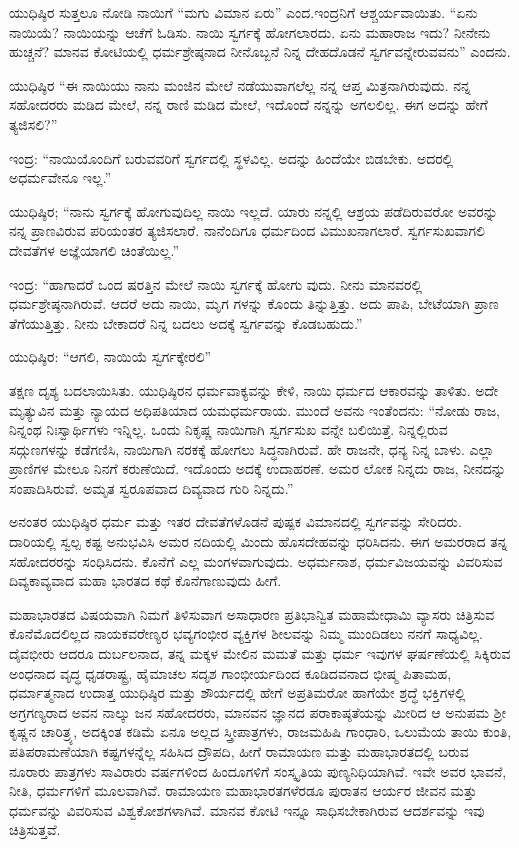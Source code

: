 ಯುಧಿಷ್ಠಿರ ಸುತ್ತಲೂ ನೋಡಿ ನಾಯಿಗೆ “ಮಗು ವಿಮಾನ ಏರು” ಎಂದ.ಇಂದ್ರನಿಗೆ ಆಶ್ಚರ್ಯವಾಯಿತು. “ಏನು ನಾಯಿಯೆ? ನಾಯಿಯನ್ನು ಆಚೆಗೆ ಓಡಿಸು. ನಾಯಿ ಸ್ವರ್ಗಕ್ಕೆ ಹೋಗಲಾರದು. ಏನು ಮಹಾರಾಜ ಇದು? ನೀನೇನು ಹುಚ್ಚನೆ? ಮಾನವ ಕೋಟಿಯಲ್ಲಿ ಧರ್ಮಶ್ರೇಷ್ಠನಾದ ನೀನೊಬ್ಬನೆ ನಿನ್ನ ದೇಹದೊಡನೆ ಸ್ವರ್ಗವನ್ನೇರುವವನು” ಎಂದನು.

ಯುಧಿಷ್ಠಿರ “ಈ ನಾಯಿಯು ನಾನು ಮಂಜಿನ ಮೇಲೆ ನಡೆಯುವಾಗಲೆಲ್ಲ ನನ್ನ ಆಪ್ತ ಮಿತ್ರನಾಗಿರುವುದು. ನನ್ನ ಸಹೋದರರು ಮಡಿದ ಮೇಲೆ, ನನ್ನ ರಾಣಿ ಮಡಿದ ಮೇಲೆ, ಇದೊಂದೆ ನನ್ನನ್ನು ಅಗಲಲಿಲ್ಲ. ಈಗ ಅದನ್ನು ಹೇಗೆ ತ್ಯಜಿಸಲಿ?”

ಇಂದ್ರ: “ನಾಯಿಯೊಂದಿಗೆ ಬರುವವರಿಗೆ ಸ್ವರ್ಗದಲ್ಲಿ ಸ್ಥಳವಿಲ್ಲ. ಅದನ್ನು ಹಿಂದೆಯೇ ಬಿಡಬೇಕು. ಅದರಲ್ಲಿ ಅಧರ್ಮವೇನೂ ಇಲ್ಲ.”

ಯುಧಿಷ್ಠಿರ; “ನಾನು ಸ್ವರ್ಗಕ್ಕೆ ಹೋಗುವುದಿಲ್ಲ ನಾಯಿ ಇಲ್ಲದೆ. ಯಾರು ನನ್ನಲ್ಲಿ ಆಶ್ರಯ ಪಡೆದಿರುವರೋ ಅವರನ್ನು ನನ್ನ ಪ್ರಾಣವಿರುವ ಪರಿಯಂತರ ತ್ಯಜಿಸಲಾರೆ. ನಾನೆಂದಿಗೂ ಧರ್ಮದಿಂದ ವಿಮುಖನಾಗಲಾರೆ. ಸ್ವರ್ಗಸುಖವಾಗಲಿ ದೇವತೆಗಳ ಅಜ್ಞೆಯಾಗಲಿ ಚಿಂತೆಯಿಲ್ಲ.”

ಇಂದ್ರ: “ಹಾಗಾದರೆ ಒಂದ ಷರತ್ತಿನ ಮೇಲೆ ನಾಯಿ ಸ್ವರ್ಗಕ್ಕೆ ಹೋಗು ವುದು. ನೀನು ಮಾನವರಲ್ಲಿ ಧರ್ಮಶ್ರೇಷ್ಠನಾಗಿರುವೆ. ಆದರೆ ಅದು ನಾಯಿ, ಮೃಗ ಗಳನ್ನು ಕೊಂದು ತಿನ್ನುತ್ತಿತ್ತು. ಅದು ಪಾಪಿ, ಬೇಟೆಯಾಗಿ ಪ್ರಾಣ ತೆಗೆಯುತ್ತಿತ್ತು. ನೀನು ಬೇಕಾದರೆ ನಿನ್ನ ಬದಲು ಅದಕ್ಕೆ ಸ್ವರ್ಗವನ್ನು ಕೊಡಬಹುದು.”

ಯುಧಿಷ್ಠಿರ: “ಆಗಲಿ, ನಾಯಿಯೆ ಸ್ವರ್ಗಕ್ಕೇರಲಿ”

ತಕ್ಷಣ ದೃಶ್ಯ ಬದಲಾಯಿಸಿತು. ಯುಧಿಷ್ಠಿರನ ಧರ್ಮವಾಕ್ಯವನ್ನು ಕೇಳಿ, ನಾಯಿ ಧರ್ಮದ ಆಕಾರವನ್ನು ತಾಳಿತು. ಅದೇ ಮೃತ್ಯುವಿನ ಮತ್ತು ನ್ಯಾಯದ ಅಧಿಪತಿಯಾದ ಯಮಧರ್ಮರಾಯ. ಮುಂದೆ ಅವನು ಇಂತೆಂದನು: “ನೋಡು ರಾಜ, ನಿನ್ನಂಥ ನಿಃಸ್ವಾರ್ಥಿಗಳು ಇನ್ನಿಲ್ಲ. ಒಂದು ನಿಕೃಷ್ಣ ನಾಯಿಗಾಗಿ ಸ್ವರ್ಗಸುಖ ವನ್ನೇ ಬಲಿಯಿತ್ತೆ. ನಿನ್ನಲ್ಲಿರುವ ಸದ್ಗುಣಗಳನ್ನು ಕಡೆಗಣಿಸಿ, ನಾಯಿಗಾಗಿ ನರಕಕ್ಕೆ ಹೋಗಲು ಸಿದ್ಧನಾಗಿರುವೆ. ಹೇ ರಾಜನೇ, ಧನ್ಯ ನಿನ್ನ ಬಾಳು. ಎಲ್ಲಾ ಪ್ರಾಣಿಗಳ ಮೇಲೂ ನಿನಗೆ ಕರುಣೆಯಿದೆ. ಇದೊಂದು ಅದಕ್ಕೆ ಉದಾಹರಣೆ. ಅಮರ ಲೋಕ ನಿನ್ನದು ರಾಜ, ನೀನದನ್ನು ಸಂಪಾದಿಸಿರುವೆ. ಅಮೃತ ಸ್ವರೂಪವಾದ ದಿವ್ಯವಾದ ಗುರಿ ನಿನ್ನದು.”

ಅನಂತರ ಯುಧಿಷ್ಠಿರ ಧರ್ಮ ಮತ್ತು ಇತರ ದೇವತೆಗಳೊಡನೆ ಪುಷ್ಪಕ ವಿಮಾನದಲ್ಲಿ ಸ್ವರ್ಗವನ್ನು ಸೇರಿದರು. ದಾರಿಯಲ್ಲಿ ಸ್ವಲ್ಪ ಕಷ್ಟ ಅನುಭವಿಸಿ ಅಮರ ನದಿಯಲ್ಲಿ ಮಿಂದು ಹೊಸದೇಹವನ್ನು ಧರಿಸಿದನು. ಈಗ ಅಮರರಾದ ತನ್ನ ಸಹೋದರರನ್ನು ಸಂಧಿಸಿದನು. ಕೊನೆಗೆ ಎಲ್ಲ ಮಂಗಳವಾಗುವುದು. ಅಧರ್ಮನಾಶ, ಧರ್ಮವಿಜಯವನ್ನು ವಿವರಿಸುವ ದಿವ್ಯಕಾವ್ಯವಾದ ಮಹಾ ಭಾರತದ ಕಥೆ ಕೊನೆಗಾಣುವುದು ಹೀಗೆ.

ಮಹಾಭಾರತದ ವಿಷಯವಾಗಿ ನಿಮಗೆ ತಿಳಿಸುವಾಗ ಅಸಾಧಾರಣ ಪ್ರತಿಭಾನ್ವಿತ ಮಹಾಮೇಧಾಮಿ ವ್ಯಾಸರು ಚಿತ್ರಿಸುವ ಕೊನೆಮೊದಲಿಲ್ಲದ ನಾಯಕವರೇಣ್ಯರ ಭವ್ಯಗಂಭೀರ ವ್ಯಕ್ತಿಗಳ ಶೀಲವನ್ನು ನಿಮ್ಮ ಮುಂದಿಡಲು ನನಗೆ ಸಾಧ್ಯವಿಲ್ಲ. ದೈವಭೀರು ಆದರೂ ದುರ್ಬಲನಾದ, ತನ್ನ ಮಕ್ಕಳ ಮೇಲಿನ ಮಮತೆ ಮತ್ತು ಧರ್ಮ ಇವುಗಳ ಘರ್ಷಣೆಯಲ್ಲಿ ಸಿಕ್ಕಿರುವ ಅಂಧನಾದ ವೃದ್ಧ ಧೃಡರಾಷ್ಟ್ರ, ಹೈಮಾಚಲ ಸದೃಶ ಗಾಂಭೀರ್ಯದಿಂದ ಕೂಡಿದವನಾದ ಭೀಷ್ಮ ಪಿತಾಮಹ, ಧರ್ಮಾತ್ಮನಾದ ಉದಾತ್ತ ಯುಧಿಷ್ಠಿರ ಮತ್ತು ಶೌರ್ಯದಲ್ಲಿ ಹೇಗೆ ಅಪ್ರತಿಮರೋ ಹಾಗೆಯೇ ಶ್ರದ್ಧೆ ಭಕ್ತಿಗಳಲ್ಲಿ ಅಗ್ರಗಣ್ಯರಾದ ಅವನ ನಾಲ್ಕು ಜನ ಸಹೋದರರು, ಮಾನವನ ಜ್ಞಾನದ ಪರಾಕಾಷ್ಠತೆಯನ್ನು ಮೀರಿದ ಆ ಅನುಪಮ ಶ‍್ರೀ ಕೃಷ್ಣನ ಚಾರಿತ್ರ್ಯ, ಅದಕ್ಕಿಂತ ಕಡಿಮೆ ಏನೂ ಅಲ್ಲದ ಸ್ತ್ರೀಪಾತ್ರಗಳು, ರಾಜಮಹಿಷಿ ಗಾಂಧಾರಿ, ಒಲುಮೆಯ ತಾಯಿ ಕುಂತಿ, ಪತಿಪರಾಮಣೆಯಾಗಿ ಕಷ್ಟಗಳನ್ನೆಲ್ಲ ಸಹಿಸಿದ ದ್ರೌಪದಿ, ಹೀಗೆ ರಾಮಾಯಣ ಮತ್ತು ಮಹಾಭಾರತದಲ್ಲಿ ಬರುವ ನೂರಾರು ಪಾತ್ರಗಳು ಸಾವಿರಾರು ವರ್ಷಗಳಿಂದ ಹಿಂದೂಗಳಿಗೆ ಸಂಸ್ಕೃತಿಯ ಪುಣ್ಯನಿಧಿಯಾಗಿವೆ. ಇವೇ ಅವರ ಭಾವನೆ, ನೀತಿ, ಧರ್ಮಗಳಿಗೆ ಮೂಲವಾಗಿವೆ. ರಾಮಾಯಣ ಮಹಾಭಾರತಗಳೆರಡೂ ಪುರಾತನ ಆರ್ಯರ ಜೀವನ ಮತ್ತು ಧರ್ಮವನ್ನು ವಿವರಿಸುವ ವಿಶ್ವಕೋಶಗಳಾಗಿವೆ. ಮಾನವ ಕೋಟಿ ಇನ್ನೂ ಸಾಧಿಸಬೇಕಾಗಿರುವ ಆದರ್ಶವನ್ನು ಇವು ಚಿತ್ರಿಸುತ್ತವೆ.


